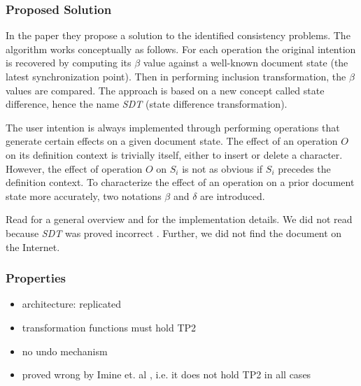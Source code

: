 \subsubsection{Proposed Solution}
In the paper \cite{sdt} they propose a solution to the identified consistency problems. The algorithm works conceptually as follows. For each operation the original intention is recovered by computing its $\beta$ value against a well-known document state (the latest synchronization point). Then in performing inclusion transformation, the $\beta$ values are compared. The approach is based on a new concept called state difference, hence the name \emph{SDT} (state difference transformation).

The user intention is always implemented through performing operations that generate certain effects on a given document state. The effect of an operation $O$ on its definition context is trivially itself, either to insert or delete a character. However, the effect of operation $O$ on $S_{i}$ is not as obvious if $S_{i}$ precedes the definition context. To characterize the effect of an operation on a prior document state more accurately, two notations $\beta$ and $\delta$ are introduced.

Read \cite{sdt} for a general overview and \cite{li03} for the implementation details. We did not read \cite{li03} because \emph{SDT} was proved incorrect \cite{imine04}. Further, we did not find the document on the Internet.


\subsubsection{Properties}
\begin{itemize}
 \item architecture: replicated
 \item transformation functions must hold TP2
 \item no undo mechanism
 \item proved wrong by Imine et. al \cite{imine04}, i.e. it does not hold
       TP2 in all cases
\end{itemize}



